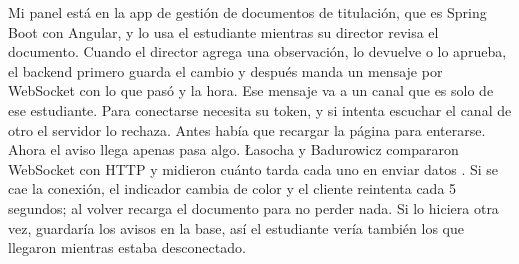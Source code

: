 Mi panel está en la app de gestión de documentos de titulación, que es Spring Boot con Angular, y lo usa el estudiante mientras su director revisa el documento.
Cuando el director agrega una observación, lo devuelve o lo aprueba, el backend primero guarda el cambio y después manda un mensaje por WebSocket con lo que pasó y la hora.
Ese mensaje va a un canal que es solo de ese estudiante. Para conectarse necesita su token, y si intenta escuchar el canal de otro el servidor lo rechaza.
Antes había que recargar la página para enterarse. Ahora el aviso llega apenas pasa algo. Łasocha y Badurowicz compararon WebSocket con HTTP y midieron cuánto tarda cada uno en enviar datos \cite{lasocha2021}.
Si se cae la conexión, el indicador cambia de color y el cliente reintenta cada 5 segundos; al volver recarga el documento para no perder nada.
Si lo hiciera otra vez, guardaría los avisos en la base, así el estudiante vería también los que llegaron mientras estaba desconectado.
